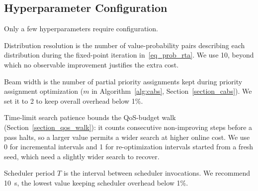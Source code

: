     \subsection{Hyperparameter Configuration}
    Only a few hyperparameters require configuration.

    Distribution resolution is the number of value-probability pairs describing each distribution during the fixed-point iteration in~\eqref{eq_prob_rta}. We use 10, beyond which no observable improvement justifies the extra cost.

    Beam width is the number of partial priority assignments kept during priority assignment optimization ($m$ in Algorithm~\ref{alg:cabs}, Section~\ref{section_cabs}). We set it to 2 to keep overall overhead below 1\%.

    Time-limit search patience bounds the QoS-budget walk (Section~\ref{section_qos_walk}): it counts consecutive non-improving steps before a pass halts, so a larger value permits a wider search at higher online cost. We use 0 for incremental intervals and 1 for re-optimization intervals started from a fresh seed, which need a slightly wider search to recover.

    Scheduler period $T$ is the interval between scheduler invocations. We recommend 10~s, the lowest value keeping scheduler overhead below 1\%.
